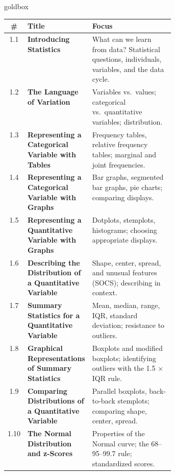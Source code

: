 \documentclass[10pt]{article}
\begin{document}
\renewcommand{\arraystretch}{1.6}
\begin{skillbox}{goldbox}
\begin{tabularx}{\linewidth}{@{} c >{\bfseries}p{0.38\linewidth} X @{}}
  \textbf{\#} & \textbf{Title} & \textbf{Focus} \\
  \hline
  1.1 & Introducing Statistics
    & What can we learn from data? Statistical questions, individuals, variables,
      and the data cycle. \\
  \hline
  1.2 & The Language of Variation
    & Variables vs.\ values; categorical vs.\ quantitative variables; distribution. \\
  \hline
  1.3 & Representing a Categorical Variable with Tables
    & Frequency tables, relative frequency tables; marginal and joint frequencies. \\
  \hline
  1.4 & Representing a Categorical Variable with Graphs
    & Bar graphs, segmented bar graphs, pie charts; comparing displays. \\
  \hline
  1.5 & Representing a Quantitative Variable with Graphs
    & Dotplots, stemplots, histograms; choosing appropriate displays. \\
  \hline
  1.6 & Describing the Distribution of a Quantitative Variable
    & Shape, center, spread, and unusual features (SOCS); describing in context. \\
  \hline
  1.7 & Summary Statistics for a Quantitative Variable
    & Mean, median, range, IQR, standard deviation; resistance to outliers. \\
  \hline
  1.8 & Graphical Representations of Summary Statistics
    & Boxplots and modified boxplots; identifying outliers with the 1.5 × IQR rule. \\
  \hline
  1.9 & Comparing Distributions of a Quantitative Variable
    & Parallel boxplots, back-to-back stemplots; comparing shape, center, spread. \\
  \hline
  1.10 & The Normal Distribution and z-Scores
    & Properties of the Normal curve; the 68--95--99.7 rule; standardized scores. \\
  \hline
\end{tabularx}
\end{skillbox}

\vspace{0.18in}
\end{document}
